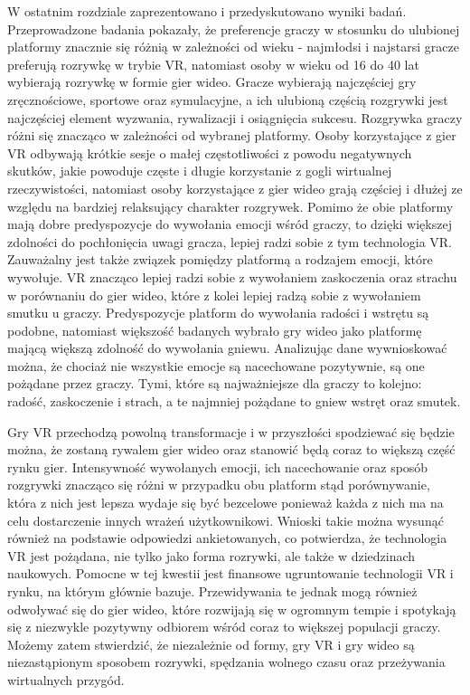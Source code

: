 W ostatnim rozdziale zaprezentowano i przedyskutowano wyniki badań. Przeprowadzone badania pokazały, że preferencje graczy w stosunku do ulubionej platformy znacznie się różnią w zależności od wieku - najmłodsi i najstarsi gracze preferują rozrywkę w trybie VR, natomiast osoby w wieku od 16 do 40 lat wybierają rozrywkę w formie gier wideo. Gracze wybierają najczęściej gry zręcznościowe, sportowe oraz symulacyjne, a ich ulubioną częścią rozgrywki jest najczęściej element wyzwania, rywalizacji i osiągnięcia sukcesu. Rozgrywka graczy różni się znacząco w zależności od wybranej platformy. Osoby korzystające z gier VR odbywają krótkie sesje o małej częstotliwości z powodu negatywnych skutków, jakie powoduje częste i długie korzystanie z gogli wirtualnej rzeczywistości, natomiast osoby korzystające z gier wideo grają częściej i dłużej ze względu na bardziej relaksujący charakter rozgrywek. Pomimo że obie platformy mają dobre predyspozycje do wywołania emocji wśród graczy, to dzięki większej zdolności do pochłonięcia uwagi gracza, lepiej radzi sobie z tym technologia VR. Zauważalny jest także związek pomiędzy platformą a rodzajem emocji, które wywołuje. VR znacząco lepiej radzi sobie z wywołaniem zaskoczenia oraz strachu w porównaniu do gier wideo, które z kolei lepiej radzą sobie z wywołaniem smutku u graczy. Predyspozycje platform do wywołania radości i wstrętu są podobne, natomiast większość badanych wybrało gry wideo jako platformę mającą większą zdolność do wywołania gniewu. Analizując dane wywnioskować można, że chociaż nie wszystkie emocje są nacechowane pozytywnie, są one pożądane przez graczy. Tymi, które są najważniejsze dla graczy to kolejno: radość, zaskoczenie i strach, a te najmniej pożądane to gniew wstręt oraz smutek. 

Gry VR przechodzą powolną transformacje i w przyszłości spodziewać się będzie
można, że zostaną rywalem gier wideo oraz stanowić będą coraz to większą część rynku
gier. Intensywność wywołanych emocji, ich nacechowanie oraz sposób rozgrywki znacząco się różni w przypadku obu platform stąd porównywanie, która z nich jest lepsza wydaje się być bezcelowe ponieważ każda z nich ma na celu dostarczenie innych wrażeń użytkownikowi. Wnioski takie można wysunąć również na podstawie odpowiedzi ankietowanych, co potwierdza, że technologia VR jest pożądana, nie tylko jako forma rozrywki, ale także w dziedzinach naukowych. Pomocne w tej kwestii jest finansowe ugruntowanie technologii VR i rynku, na
którym głównie bazuje. Przewidywania te jednak mogą również odwoływać się do gier
wideo, które rozwijają się w ogromnym tempie i spotykają się z niezwykle pozytywny
odbiorem wśród coraz to większej populacji graczy. Możemy zatem stwierdzić, że niezależnie od formy, gry VR i
gry wideo są niezastąpionym sposobem rozrywki, spędzania wolnego czasu oraz przeżywania
wirtualnych przygód.



